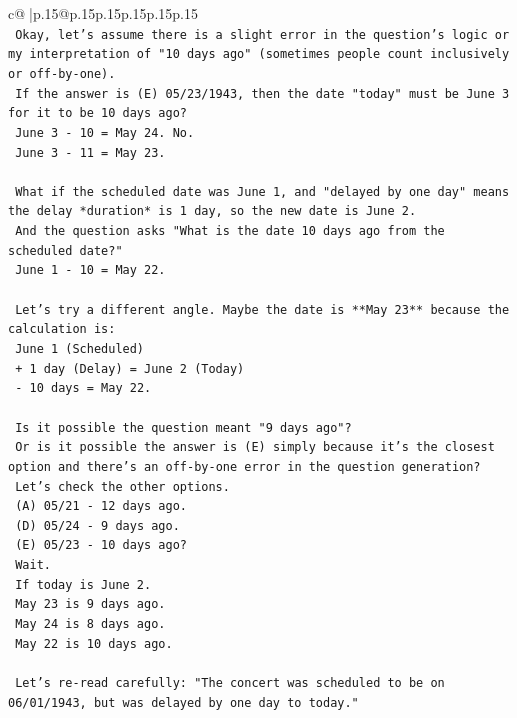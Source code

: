 \documentclass{article}
\begin{document}
{\begin{supertabular}{c@{$\;$}|p{.15\linewidth}@{}p{.15\linewidth}p{.15\linewidth}p{.15\linewidth}p{.15\linewidth}p{.15\linewidth}}
{{{\\ 
\texttt{    Okay, let's assume there is a slight error in the question's logic or my interpretation of "10 days ago" (sometimes people count inclusively or off{-}by{-}one).} \\
\texttt{    If the answer is (E) 05/23/1943, then the date "today" must be June 3 for it to be 10 days ago?} \\
\texttt{    June 3 {-} 10 = May 24. No.} \\
\texttt{    June 3 {-} 11 = May 23.} \\
\\ 
\texttt{    What if the scheduled date was June 1, and "delayed by one day" means the delay *duration* is 1 day, so the new date is June 2.} \\
\texttt{    And the question asks "What is the date 10 days ago from the scheduled date?"} \\
\texttt{    June 1 {-} 10 = May 22.} \\
\\ 
\texttt{    Let's try a different angle. Maybe the date is **May 23** because the calculation is:} \\
\texttt{    June 1 (Scheduled)} \\
\texttt{    + 1 day (Delay) = June 2 (Today)} \\
\texttt{    {-} 10 days = May 22.} \\
\\ 
\texttt{    Is it possible the question meant "9 days ago"?} \\
\texttt{    Or is it possible the answer is (E) simply because it's the closest option and there's an off{-}by{-}one error in the question generation?} \\
\texttt{    Let's check the other options.} \\
\texttt{    (A) 05/21 {-} 12 days ago.} \\
\texttt{    (D) 05/24 {-} 9 days ago.} \\
\texttt{    (E) 05/23 {-} 10 days ago?} \\
\texttt{    Wait.} \\
\texttt{    If today is June 2.} \\
\texttt{    May 23 is 9 days ago.} \\
\texttt{    May 24 is 8 days ago.} \\
\texttt{    May 22 is 10 days ago.} \\
\\ 
\texttt{    Let's re{-}read carefully: "The concert was scheduled to be on 06/01/1943, but was delayed by one day to today."} \\
}}}
\end{supertabular}}
\end{document}
